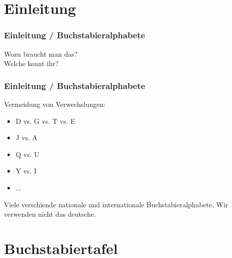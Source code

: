 

\subtitle{Betriebstechnik/Vorschriften 02:         \\
          Das "Internationale Buchstabieralphabet" \\[2em]}
\date{Stand 30.10.2014}



\section*{Einleitung}

\begin{frame}
    \frametitle{Einleitung / Buchstabieralphabete}
    \begin{center}
        \Large{Wozu braucht man das?} \\
        \Large{Welche kennt ihr?}
    \end{center}
\end{frame}

\begin{frame}
    \frametitle{Einleitung / Buchstabieralphabete}

    Vermeidung von Verwechslungen:

    \begin{itemize}
        \item D vs. G vs. T vs. E
        \item J vs. A
        \item Q vs. U
        \item Y vs. I
        \item ...
    \end{itemize}

    Viele verschiende nationale und internationale Buchstabieralphabete. Wir
    verwenden nicht das deutsche.

\end{frame}

\section*{Buchstabiertafel}

